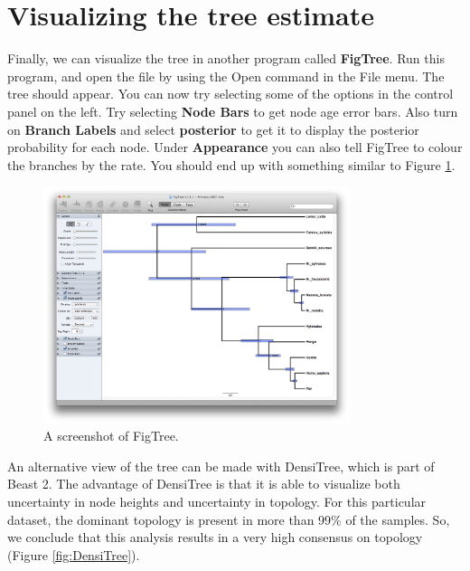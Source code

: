 \documentclass[11pt]{article}
\theoremstyle{plain}%
\theoremstyle{definition}
\theoremstyle{remark}
\begin{document}
\section{Visualizing the tree estimate}
Finally, we can visualize the tree in another program called {\bf FigTree}. Run this program, and open
the \mccTree{} file by using the Open command in the File menu. The tree should appear.
You can now try selecting some of the options in the control panel on the left. Try selecting
{\bf Node Bars} to get node age error bars. Also turn on {\bf Branch Labels} and select {\bf posterior} to get
it to display the posterior probability for each node. Under {\bf Appearance} you can also tell FigTree
to colour the branches by the rate.
You should end up with something similar to Figure \ref{fig:FigTree}.

\begin{figure}
\includegraphics[width=0.8\textwidth]{figures/FigTree}
\caption{A screenshot of FigTree.}
\label{fig:FigTree}
\end{figure}

An alternative view of the tree can be made with DensiTree, which is part of Beast 2. The advantage
of DensiTree is that it is able to visualize both uncertainty in node heights and uncertainty in topology.
For this particular dataset, the dominant topology is present in more than 99\% of the samples. So, 
we conclude that this analysis results in a very high consensus on topology (Figure \ref{fig:DensiTree}).
\end{document}

